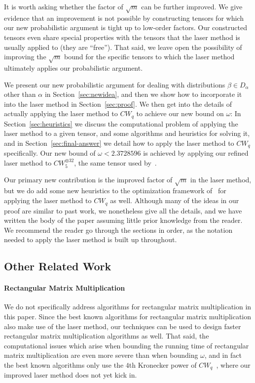 \documentclass{theoretics}
\begin{document}
It is worth asking whether the factor of $\sqrt{m}$ can be further improved. We give evidence that an improvement is not possible by constructing tensors for which our new probabilistic argument is tight up to low-order factors.  Our constructed tensors even share special properties with the tensors that the laser method is usually applied to (they are ``free'').
That said, we leave open the possibility of improving the $\sqrt m$ bound for the specific tensors to which the laser method ultimately applies our probabilistic argument. 

We present our new probabilistic argument for dealing with distributions $\beta \in D_\alpha$ other than $\alpha$ in Section~\ref{sec:newidea}, and then we show how to incorporate it into the laser method in Section~\ref{sec:proof}. We then get into the details of actually applying the laser method to $CW_q$ to achieve our new bound on $\omega$: In Section~\ref{sec:heuristics} we discuss the computational problem of applying the laser method to a given tensor, and some algorithms and heuristics for solving it, and in Section~\ref{sec:final-answer} we detail how to apply the laser method to $CW_q$ specifically. Our new bound of $\omega<2.3728596$ is achieved by applying our refined laser method to $CW_5^{\otimes 32}$, the same tensor used by~\cite{legall}.

Our primary new contribution is the improved factor of $\sqrt{m}$ in the laser method, but we do add some new heuristics to the optimization framework of~\cite{v12,legall} for applying the laser method to $CW_q$ as well. Although many of the ideas in our proof are similar to past work, we nonetheless give all the details, and we have written the body of the paper assuming little prior knowledge from the reader. We recommend the reader go through the sections in order, as the notation needed to apply the laser method is built up throughout.


\subsection{Other Related Work}

\paragraph*{Rectangular Matrix Multiplication}

We do not specifically address algorithms for rectangular matrix multiplication in this paper. Since the best known algorithms for rectangular matrix multiplication also make use of the laser method, our techniques can be used to design faster rectangular matrix multiplication algorithms as well. That said, the computational issues which arise when bounding the running time of rectangular matrix multiplication are even more severe than when bounding $\omega$, and in fact the best known algorithms only use the $4$th Kronecker power of $CW_q$~\cite{legallrect2}, where our improved laser method does not yet kick in. 
\end{document}
